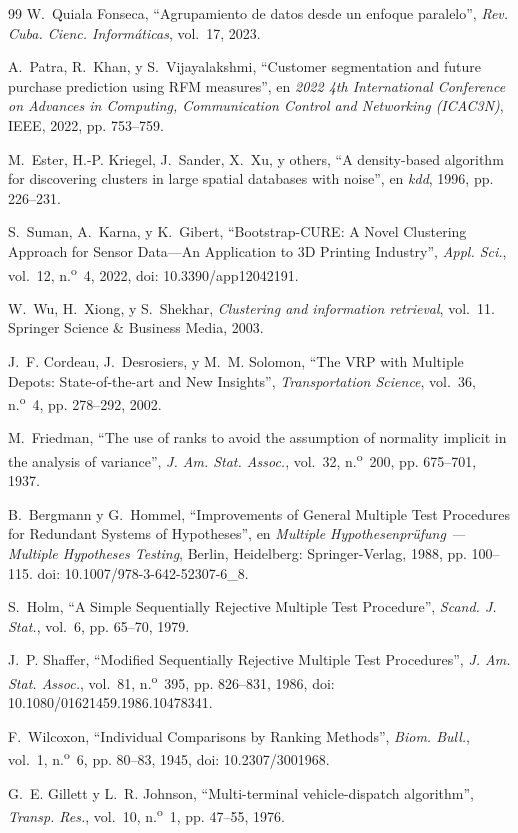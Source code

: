 \begin{thebibliography}{99}
 W.~Quiala Fonseca, ``Agrupamiento de datos desde un enfoque paralelo'', \emph{Rev. Cuba. Cienc. Inform\'aticas}, vol.~17, 2023.

 A.~Patra, R.~Khan, y S.~Vijayalakshmi, ``Customer segmentation and future purchase prediction using RFM measures'', en \emph{2022 4th International Conference on Advances in Computing, Communication Control and Networking (ICAC3N)}, IEEE, 2022, pp. 753--759.

 M.~Ester, H.-P. Kriegel, J.~Sander, X.~Xu, y others, ``A density-based algorithm for discovering clusters in large spatial databases with noise'', en \emph{kdd}, 1996, pp. 226--231.

 S.~Suman, A.~Karna, y K.~Gibert, ``Bootstrap-CURE: A Novel Clustering Approach for Sensor Data---An Application to 3D Printing Industry'', \emph{Appl. Sci.}, vol.~12, n.\textsuperscript{o}~4, 2022, doi: 10.3390/app12042191.

 W.~Wu, H.~Xiong, y S.~Shekhar, \emph{Clustering and information retrieval}, vol.~11. Springer Science \& Business Media, 2003.

 J.~F. Cordeau, J.~Desrosiers, y M.~M. Solomon, ``The VRP with Multiple Depots: State-of-the-art and New Insights'', \emph{Transportation Science}, vol.~36, n.\textsuperscript{o}~4, pp. 278--292, 2002.

 M.~Friedman, ``The use of ranks to avoid the assumption of normality implicit in the analysis of variance'', \emph{J. Am. Stat. Assoc.}, vol.~32, n.\textsuperscript{o}~200, pp. 675--701, 1937.

 B.~Bergmann y G.~Hommel, ``Improvements of General Multiple Test Procedures for Redundant Systems of Hypotheses'', en \emph{Multiple Hypothesenpr\"ufung --- Multiple Hypotheses Testing}, Berlin, Heidelberg: Springer-Verlag, 1988, pp. 100--115. doi: 10.1007/978-3-642-52307-6\_8.

 S.~Holm, ``A Simple Sequentially Rejective Multiple Test Procedure'', \emph{Scand. J. Stat.}, vol.~6, pp. 65--70, 1979.

 J.~P. Shaffer, ``Modified Sequentially Rejective Multiple Test Procedures'', \emph{J. Am. Stat. Assoc.}, vol.~81, n.\textsuperscript{o}~395, pp. 826--831, 1986, doi: 10.1080/01621459.1986.10478341.

 F.~Wilcoxon, ``Individual Comparisons by Ranking Methods'', \emph{Biom. Bull.}, vol.~1, n.\textsuperscript{o}~6, pp. 80--83, 1945, doi: 10.2307/3001968.

 G.~E. Gillett y L.~R. Johnson, ``Multi-terminal vehicle-dispatch algorithm'', \emph{Transp. Res.}, vol.~10, n.\textsuperscript{o}~1, pp. 47--55, 1976.

\end{thebibliography}

